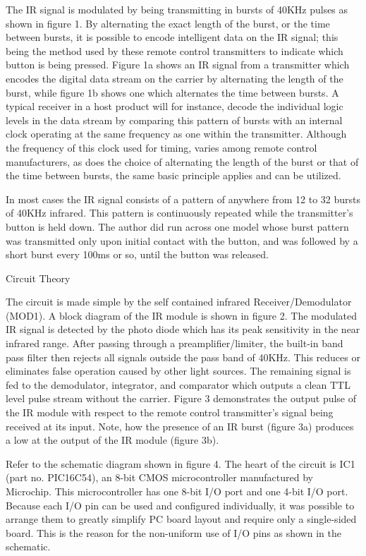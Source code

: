      The IR signal is modulated by being transmitting in bursts of
40KHz pulses as shown in figure 1. By alternating the exact length of
the burst, or the time between bursts, it is possible to encode
intelligent data on the IR signal; this being the method used by
these remote control transmitters to indicate which button is being
pressed. Figure 1a shows an IR signal from a transmitter which
encodes the digital data stream on the carrier by alternating the
length of the burst, while figure 1b shows one which alternates the
time between bursts. A typical receiver in a host product will for
instance, decode the individual logic levels in the data stream by
comparing this pattern of bursts with an internal clock operating at
the same frequency as one within the transmitter. Although the
frequency of this clock used for timing, varies among remote control
manufacturers, as does the choice of alternating the length of the
burst or that of the time between bursts, the same basic principle
applies and can be utilized.

     In most cases the IR signal consists of a pattern of anywhere
from 12 to 32 bursts of 40KHz infrared. This pattern is continuously
repeated while the transmitter's button is held down. The author did
run across one model whose burst pattern was transmitted only upon
initial contact with the button, and was followed by a short burst
every 100ms or so, until the button was released.

Circuit Theory

     The circuit is made simple by the self contained infrared
Receiver/Demodulator (MOD1). A block diagram of the IR module is
shown in figure 2. The modulated IR signal is detected by the photo
diode which has its peak sensitivity in the near infrared range.
After passing through a preamplifier/limiter, the built-in band pass
filter then rejects all signals outside the pass band of 40KHz. This
reduces or eliminates false operation caused by other light sources.
The remaining signal is fed to the demodulator, integrator, and
comparator which outputs a clean TTL level pulse stream without the
carrier. Figure 3 demonstrates the output pulse of the IR module with
respect to the remote control transmitter's signal being received at
its input. Note, how the presence of an IR burst (figure 3a) produces
a low at the output of the IR module (figure 3b).

     Refer to the schematic diagram shown in figure 4. The heart of
the circuit is IC1 (part no. PIC16C54), an 8-bit CMOS microcontroller
manufactured by Microchip. This microcontroller has one 8-bit I/O
port and one 4-bit I/O port. Because each I/O pin can be used and
configured individually, it was possible to arrange them to greatly
simplify PC board layout and require only a single-sided board. This
is the reason for the non-uniform use of I/O pins as shown in the
schematic.

